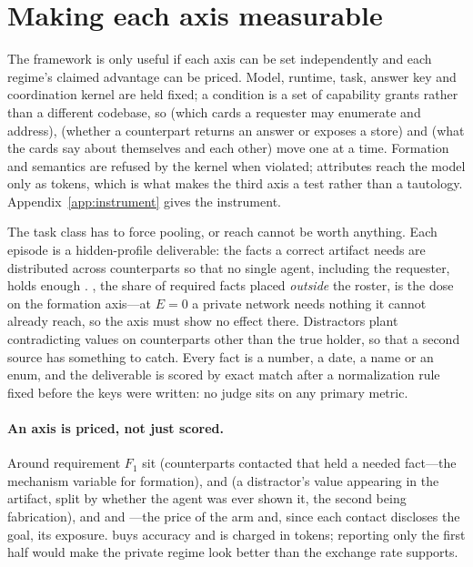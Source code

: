 \section{Making each axis measurable}
\label{sec:quantifying}

The framework is only useful if each axis can be set independently and each regime's
claimed advantage can be priced. Model, runtime, task, answer key and coordination kernel
are held fixed; a condition is a set of capability grants rather than a different codebase,
so  (which cards a requester may enumerate and address), 
(whether a counterpart returns an answer or exposes a store) and  (what the
cards say about themselves and each other) move one at a time. Formation and semantics are
refused by the kernel when violated; attributes reach the model only as tokens, which is
what makes the third axis a test rather than a tautology. Appendix~\ref{app:instrument}
gives the instrument.

The task class has to force pooling, or reach cannot be worth anything. Each episode is a
hidden-profile deliverable: the facts a correct artifact needs are distributed across
counterparts so that no single agent, including the requester, holds enough
\citep{stasser1985}. , the share of required facts placed \emph{outside} the
roster, is the dose on the formation axis---at $E=0$ a private network needs nothing it
cannot already reach, so the axis must show no effect there. Distractors plant contradicting
values on counterparts other than the true holder, so that a second source has something to
catch. Every fact is a number, a date, a name or an enum, and the deliverable is scored by
exact match after a normalization rule fixed before the keys were written: no judge sits on
any primary metric.

\paragraph{An axis is priced, not just scored.} Around requirement $F_1$ sit
 (counterparts contacted that held a needed fact---the mechanism
variable for formation),  and  (a distractor's
value appearing in the artifact, split by whether the agent was ever shown it, the second
being fabrication), and  and ---the price of the arm and,
since each contact discloses the goal, its exposure.  buys accuracy and is
charged in tokens; reporting only the first half would make the private regime look better
than the exchange rate supports.

